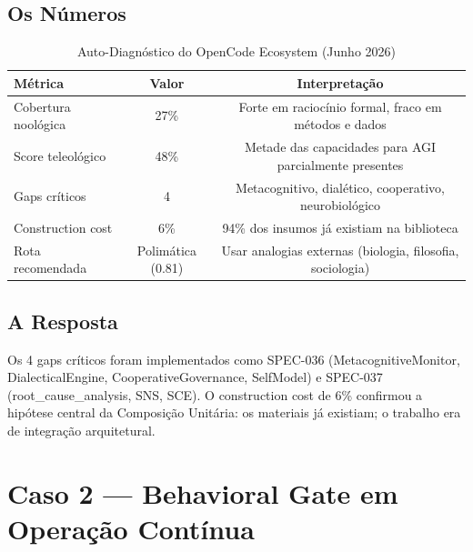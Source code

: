 \subsection{Os Números}

\begin{table}[H]
\centering
\small
\caption{Auto-Diagnóstico do OpenCode Ecosystem (Junho 2026)}
\label{tab:auto_diagnosis}
\begin{tabular}{lcc}
\toprule
\textbf{Métrica} & \textbf{Valor} & \textbf{Interpretação} \\
\midrule
Cobertura noológica & 27\% & Forte em raciocínio formal, fraco em métodos e dados \\
Score teleológico & 48\% & Metade das capacidades para AGI parcialmente presentes \\
Gaps críticos & 4 & Metacognitivo, dialético, cooperativo, neurobiológico \\
Construction cost & 6\% & 94\% dos insumos já existiam na biblioteca \\
Rota recomendada & Polimática (0.81) & Usar analogias externas (biologia, filosofia, sociologia) \\
\bottomrule
\end{tabular}
\end{table}

\subsection{A Resposta}

Os 4 gaps críticos foram implementados como SPEC-036 (MetacognitiveMonitor, DialecticalEngine, CooperativeGovernance, SelfModel) e SPEC-037 (root\_cause\_analysis, SNS, SCE). O construction cost de 6\% confirmou a hipótese central da Composição Unitária: os materiais já existiam; o trabalho era de integração arquitetural.

\section{Caso 2 — Behavioral Gate em Operação Contínua}


